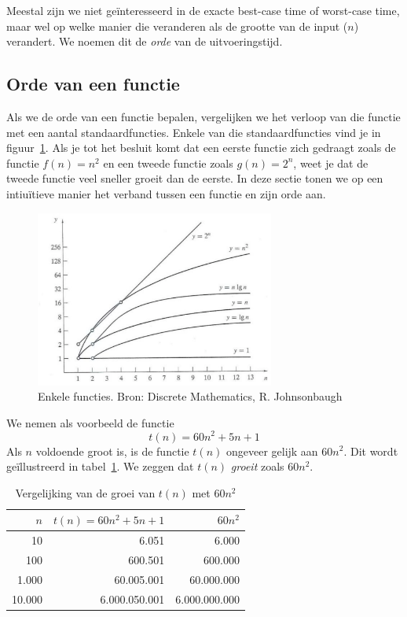 Meestal zijn we niet geïnteresseerd in de exacte best-case time of worst-case time, maar wel op welke manier die veranderen als de grootte van de input ($n$) verandert. We noemen dit de \emph{orde} van de uitvoeringstijd.

\subsection{Orde van een functie}
Als we de orde van een functie bepalen, vergelijken we het verloop van die functie met een aantal standaardfuncties. Enkele van die standaardfuncties vind je in figuur~\ref{fig:standaardfuncties}. Als je tot het besluit komt dat een eerste functie zich gedraagt zoals de functie $f(n)=n^2$ en een tweede functie zoals $g(n)=2^n$, weet je dat de tweede functie veel sneller groeit dan de eerste. In deze sectie tonen we op een intiuïtieve manier het verband tussen een functie en zijn orde aan.



\begin{figure}[htbp]
\begin{center}
\includegraphics[width=0.7\textwidth]{figuren/telproblemen/functies.pdf}
\caption{Enkele functies. Bron: Discrete Mathematics, R. Johnsonbaugh}
\label{fig:standaardfuncties}
\end{center}
\end{figure}





We nemen als voorbeeld de functie 
\begin{equation}
	t(n)=60n^2+5n+1
	\label{eq:nkwad}
\end{equation}
Als $n$ voldoende groot is, is de functie $t(n)$ ongeveer gelijk aan $60n^2$.  Dit wordt geïllustreerd in tabel~\ref{table:nkwad}. We zeggen dat $t(n)$ \emph{groeit} zoals $60n^2$. 
\begin{table}[h]
\caption{Vergelijking van de groei van $t(n)$ met $60n^2$}
\label{table:nkwad}
\centering
\begin{tabular}{rrr}
\toprule
$n$&$t(n)=60n^2+5n+1$&$60n^2$ \\
\midrule
10&6.051&6.000\\
100&600.501&600.000\\
1.000&60.005.001&60.000.000\\
10.000&6.000.050.001&6.000.000.000\\
\bottomrule
\end{tabular}
\end{table}


